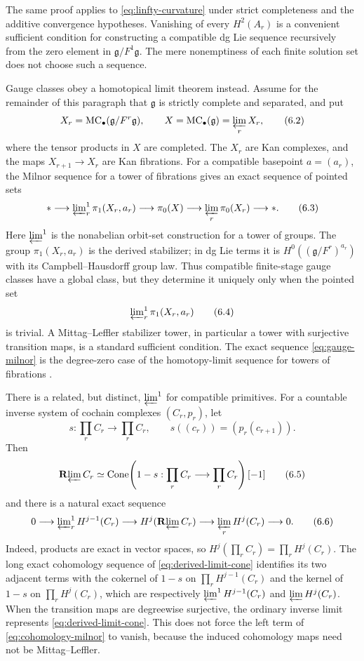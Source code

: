 \documentclass[11pt]{article}
\theoremstyle{definition}
\theoremstyle{remark}
\newcommand{\MC}{\operatorname{MC}}
\newcommand{\Cone}{\operatorname{Cone}}
\newcommand{\Rlim}{\mathbf R\!\varprojlim}
\begin{document}
The same proof applies to \eqref{eq:linfty-curvature} under strict
completeness and the additive convergence hypotheses.  Vanishing of every
$H^2(A_r)$ is a convenient sufficient condition for constructing a
compatible dg Lie sequence recursively from the zero element in
$\mathfrak g/F^1\mathfrak g$.  The mere nonemptiness of each finite solution
set does not choose such a sequence.

Gauge classes obey a homotopical limit theorem instead.  Assume for the
remainder of this paragraph that $\mathfrak g$ is strictly complete and
separated, and put
\[
 X_r=\MC_\bullet(\mathfrak g/F^r\mathfrak g),
 \qquad
 X=\MC_\bullet(\mathfrak g)=\varprojlim_rX_r,
 \tag{6.2}\label{eq:tower-mc-spaces}
\]
where the tensor products in $X$ are completed.  The $X_r$ are Kan complexes,
and the maps $X_{r+1}\to X_r$ are Kan fibrations.  For a compatible
basepoint $a=(a_r)$, the Milnor sequence for a tower of fibrations gives an
exact sequence of pointed sets
\[
 *\longrightarrow
 \varprojlim\nolimits^1_r\pi_1(X_r,a_r)
 \longrightarrow
 \pi_0(X)
 \longrightarrow
 \varprojlim_r\pi_0(X_r)
 \longrightarrow *.
 \tag{6.3}\label{eq:gauge-milnor}
\]
Here $\varprojlim^1$ is the nonabelian orbit-set construction for a tower of
groups.  The group $\pi_1(X_r,a_r)$ is the derived stabilizer; in dg Lie
terms it is $H^0((\mathfrak g/F^r)^{a_r})$ with its Campbell--Hausdorff group
law.  Thus compatible finite-stage gauge classes have a global class, but
they determine it uniquely only when the pointed set
\[
 \varprojlim\nolimits^1_r\pi_1(X_r,a_r)
 \tag{6.4}\label{eq:stabilizer-lim1}
\]
is trivial.  A Mittag--Leffler stabilizer tower, in particular a tower with
surjective transition maps, is a standard sufficient condition.  The exact
sequence \eqref{eq:gauge-milnor} is the degree-zero case of the homotopy-limit
sequence for towers of fibrations \cite{Hirschhorn}.

There is a related, but distinct, $\varprojlim^1$ for compatible primitives.
For a countable inverse system of cochain complexes $(C_r,p_r)$, let
\[
 s:\prod_rC_r\longrightarrow\prod_rC_r,
 \qquad
 s((c_r))=(p_r(c_{r+1})).
\]
Then
\[
 \Rlim C_r\simeq
 \Cone\!\left(1-s:\prod_rC_r\longrightarrow\prod_rC_r\right)[-1]
 \tag{6.5}\label{eq:derived-limit-cone}
\]
and there is a natural exact sequence
\[
 0\longrightarrow
 \varprojlim\nolimits^1_rH^{j-1}(C_r)
 \longrightarrow H^j(\Rlim C_r)
 \longrightarrow\varprojlim_rH^j(C_r)
 \longrightarrow0.
 \tag{6.6}\label{eq:cohomology-milnor}
\]
Indeed, products are exact in vector spaces, so
$H^j(\prod_rC_r)=\prod_rH^j(C_r)$.  The long exact cohomology sequence of
\eqref{eq:derived-limit-cone} identifies its two adjacent terms with the
cokernel of $1-s$ on $\prod_rH^{j-1}(C_r)$ and the kernel of $1-s$ on
$\prod_rH^j(C_r)$, which are respectively $\varprojlim^1H^{j-1}(C_r)$ and
$\varprojlim H^j(C_r)$.
When the transition maps are degreewise surjective, the ordinary inverse
limit represents \eqref{eq:derived-limit-cone}.  This does not force the
left term of \eqref{eq:cohomology-milnor} to vanish, because the induced
cohomology maps need not be Mittag--Leffler.
\end{document}
